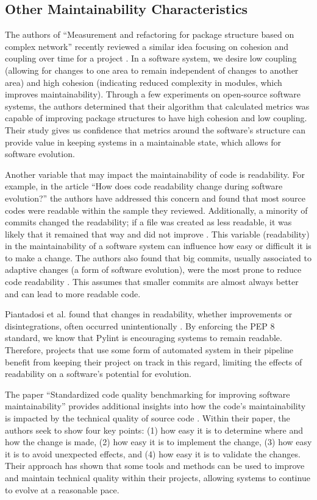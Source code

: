 
\subsection{Other Maintainability Characteristics}

The authors of ``Measurement and refactoring for package structure based on complex network'' recently reviewed a similar idea focusing on cohesion and coupling over time for a project \cite{zhou:2020}. In a software system, we desire low coupling (allowing for changes to one area to remain independent of changes to another area) and high cohesion (indicating reduced complexity in modules, which improves maintainability). Through a few experiments on open-source software systems, the authors determined that their algorithm that calculated metrics was capable of improving package structures to have high cohesion and low coupling. Their study gives us confidence that metrics around the software's structure can provide value in keeping systems in a maintainable state, which allows for software evolution.

Another variable that may impact the maintainability of code is readability. For example, in the article ``How does code readability change during software evolution?'' the authors have addressed this concern and found that most source codes were readable within the sample they reviewed. Additionally, a minority of commits changed the readability; if a file was created as less readable, it was likely that it remained that way and did not improve \cite{piantadosi:2020}. This variable (readability) in the maintainability of a software system can influence how easy or difficult it is to make a change. The authors also found that big commits, usually associated to adaptive changes (a form of software evolution), were the most prone to reduce code readability \cite{piantadosi:2020}. This assumes that smaller commits are almost always better and can lead to more readable code.

Piantadosi et al. found that changes in readability, whether improvements or disintegrations, often occurred unintentionally \cite{piantadosi:2020}. By enforcing the PEP 8 standard, we know that Pylint is encouraging systems to remain readable. Therefore, projects that use some form of automated system in their pipeline benefit from keeping their project on track in this regard, limiting the effects of readability on a software's potential for evolution.

The paper ``Standardized code quality benchmarking for improving software maintainability'' provides additional insights into how the code's maintainability is impacted by the technical quality of source code \cite{baggen:2012}. Within their paper, the authors seek to show four key points: (1) how easy it is to determine where and how the change is made, (2) how easy it is to implement the change, (3) how easy it is to avoid unexpected effects, and (4) how easy it is to validate the changes. Their approach has shown that some tools and methods can be used to improve and maintain technical quality within their projects, allowing systems to continue to evolve at a reasonable pace.
